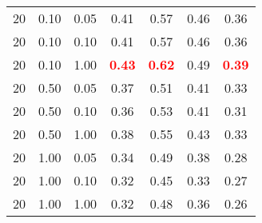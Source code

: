 \begin{tabular}{lllcccc}
20 & 0.10 & 0.05 & 0.41 & 0.57 & 0.46 & 0.36 \\ 
20 & 0.10 & 0.10 & 0.41 & 0.57 & 0.46 & 0.36 \\ 
20 & 0.10 & 1.00 & \textbf{\textcolor{red}{0.43}} & \textbf{\textcolor{red}{0.62}} & 0.49 & \textbf{\textcolor{red}{0.39}} \\ 
20 & 0.50 & 0.05 & 0.37 & 0.51 & 0.41 & 0.33 \\ 
20 & 0.50 & 0.10 & 0.36 & 0.53 & 0.41 & 0.31 \\ 
20 & 0.50 & 1.00 & 0.38 & 0.55 & 0.43 & 0.33 \\ 
20 & 1.00 & 0.05 & 0.34 & 0.49 & 0.38 & 0.28 \\ 
20 & 1.00 & 0.10 & 0.32 & 0.45 & 0.33 & 0.27 \\ 
20 & 1.00 & 1.00 & 0.32 & 0.48 & 0.36 & 0.26 \\ 
\end{tabular} 
